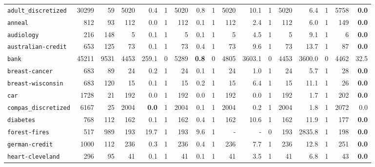 \begin{tabular}{lccrrrrrrrrrrrrrr}
\texttt{adult\_discretized} & \multicolumn{1}{r}{30299} & \multicolumn{1}{r}{59}  & 5020 & 0.4 & 1 & 5020 & 0.8 & 1 & 5020 & 10.1 & 1 & 5020 & 6.4 & 1 & 5758 & \textbf{0.0}\\
\texttt{anneal} & \multicolumn{1}{r}{812} & \multicolumn{1}{r}{93}  & 112 & 0.0 & 1 & 112 & 0.1 & 1 & 112 & 2.4 & 1 & 112 & 6.0 & 1 & 149 & \textbf{0.0}\\
\texttt{audiology} & \multicolumn{1}{r}{216} & \multicolumn{1}{r}{148}  & 5 & 0.1 & 1 & 5 & 0.1 & 1 & 5 & 4.5 & 1 & 5 & 9.1 & 1 & 6 & \textbf{0.0}\\
\texttt{australian-credit} & \multicolumn{1}{r}{653} & \multicolumn{1}{r}{125}  & 73 & 0.1 & 1 & 73 & 0.4 & 1 & 73 & 9.6 & 1 & 73 & 13.7 & 1 & 87 & \textbf{0.0}\\
\texttt{bank} & \multicolumn{1}{r}{45211} & \multicolumn{1}{r}{9531}  & 4453 & 259.1 & 0 & 5289 & \textbf{0.8} & 0 & 4805 & 3603.1 & 0 & 4453 & 3600.0 & 0 & 4462 & 32.5\\
\texttt{breast-cancer} & \multicolumn{1}{r}{683} & \multicolumn{1}{r}{89}  & 24 & 0.2 & 1 & 24 & 0.1 & 1 & 24 & 1.0 & 1 & 24 & 5.7 & 1 & 28 & \textbf{0.0}\\
\texttt{breast-wisconsin} & \multicolumn{1}{r}{683} & \multicolumn{1}{r}{120}  & 15 & 0.1 & 1 & 15 & 0.2 & 1 & 15 & 6.4 & 1 & 15 & 11.1 & 1 & 26 & \textbf{0.0}\\
\texttt{car} & \multicolumn{1}{r}{1728} & \multicolumn{1}{r}{21}  & 192 & 0.0 & 1 & 192 & 0.0 & 1 & 192 & 0.0 & 1 & 192 & 1.7 & 1 & 202 & \textbf{0.0}\\
\texttt{compas\_discretized} & \multicolumn{1}{r}{6167} & \multicolumn{1}{r}{25}  & 2004 & \textbf{0.0} & 1 & 2004 & 0.1 & 1 & 2004 & 0.2 & 1 & 2004 & 1.8 & 1 & 2072 & 0.0\\
\texttt{diabetes} & \multicolumn{1}{r}{768} & \multicolumn{1}{r}{112}  & 162 & 0.1 & 1 & 162 & 0.4 & 1 & 162 & 10.6 & 1 & 162 & 11.9 & 1 & 177 & \textbf{0.0}\\
\texttt{forest-fires} & \multicolumn{1}{r}{517} & \multicolumn{1}{r}{989}  & 193 & 19.7 & 1 & 193 & 9.6 & 1 & - & - & 0 & 193 & 2835.8 & 1 & 198 & \textbf{0.0}\\
\texttt{german-credit} & \multicolumn{1}{r}{1000} & \multicolumn{1}{r}{112}  & 236 & 0.3 & 1 & 236 & 0.4 & 1 & 236 & 7.7 & 1 & 236 & 12.8 & 1 & 251 & \textbf{0.0}\\
\texttt{heart-cleveland} & \multicolumn{1}{r}{296} & \multicolumn{1}{r}{95}  & 41 & 0.1 & 1 & 41 & 0.1 & 1 & 41 & 3.5 & 1 & 41 & 6.8 & 1 & 43 & \textbf{0.0}\\

\end{tabular}
